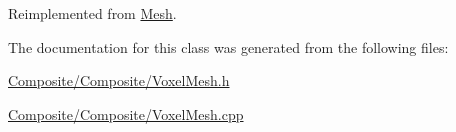 Reimplemented from \mbox{\hyperlink{class_mesh_a530e7b4ea82226f6e15b0ff6c36ea3d8}{Mesh}}.



The documentation for this class was generated from the following files\+:\begin{DoxyCompactItemize}
\item 
\mbox{\hyperlink{_composite_2_composite_2_voxel_mesh_8h}{Composite/\+Composite/\+Voxel\+Mesh.\+h}}\item 
\mbox{\hyperlink{_composite_2_composite_2_voxel_mesh_8cpp}{Composite/\+Composite/\+Voxel\+Mesh.\+cpp}}\end{DoxyCompactItemize}
